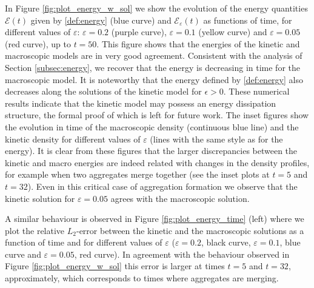 \documentclass{aims} %
\theoremstyle{definition}
\newcommand {\e}  {\varepsilon}
\begin{document}
{In Figure \ref{fig:plot_energy_w_sol} we show the evolution of the energy quantities $\mathcal{E}(t)$ given by \eqref{def:energy} (blue curve) and $\mathcal{E}_\varepsilon(t)$ as functions of time, for different values of $\e$: $\varepsilon=0.2$ (purple curve), $\e = 0.1$ (yellow curve) and $\e = 0.05$ (red curve), up to $t=50$. This figure shows that the energies of the kinetic and macroscopic models are in very good agreement}. Consistent with the analysis of Section \ref{subsec:energy}, we recover that the energy is decreasing in time for the macroscopic model. It is noteworthy that the energy defined by \eqref{def:energy} also decreases along the solutions of the kinetic model for $\epsilon>0$. These numerical results indicate that the kinetic model may possess an energy dissipation structure, the formal proof of which is left for future work. The inset figures show the evolution in time of the macroscopic density (continuous blue line) and the kinetic density for different values of $\e$ (lines with the same style as for the energy). It is clear from these figures that the larger discrepancies between the kinetic and macro energies are indeed related with changes in the density profiles, for example when two aggregates merge together {(see the inset plots at $t=5$ and $t=32$)}. {Even in this critical case of aggregation formation we observe that the kinetic solution for $\e=0.05$ agrees with the macroscopic solution.}

A similar behaviour is observed in Figure \ref{fig:plot_energy_time} (left) where we plot the {relative} $L_2$-error between the kinetic and the macroscopic solutions {as a function of time} and for different values of $\e$ {($\e = 0.2$, black curve, $\e = 0.1$, blue curve and $\e = 0.05$, red curve)}. In agreement with the behaviour observed in Figure \ref{fig:plot_energy_w_sol} this error is {larger} at times $t=5$ and $t=32$, approximately, which corresponds {to times where aggregates are merging}.
\end{document}
